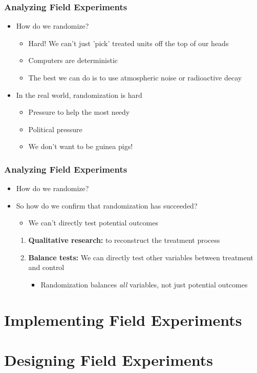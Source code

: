 \documentclass[xcolor=x11names,compress]{beamer}\usepackage[]{graphicx}\usepackage[]{color}
\renewcommand{\(}{\begin{columns}}
\renewcommand{\)}{\end{columns}}
\newcommand{\<}[1]{\begin{column}{#1}}
\renewcommand{\>}{\end{column}}
\begin{document}
\begin{frame}
\frametitle{Analyzing Field Experiments}
\begin{itemize}
\item How do we randomize?
\begin{itemize}
\item Hard! We can't just 'pick' treated units off the top of our heads
\pause
\item Computers are deterministic
\pause
\item The best we can do is to use atmospheric noise or radioactive decay
\pause
\end{itemize}
\item In the real world, randomization is hard
\begin{itemize}
\item Pressure to help the most needy
\pause
\item Political pressure
\pause
\item We don't want to be guinea pigs!
\end{itemize}
\end{itemize}
\end{frame}

\begin{frame}
\frametitle{Analyzing Field Experiments}
\begin{itemize}
\item How do we randomize?
\pause
\item So how do we confirm that randomization has succeeded?
\pause
\begin{itemize}
\item We can't directly test potential outcomes
\end{itemize}
\begin{enumerate}
\item \textbf{Qualitative research:} to reconstruct the treatment process
\pause
\item \textbf{Balance tests:} We can directly test other variables between treatment and control
\begin{itemize}
\item Randomization balances \textit{all} variables, not just potential outcomes
\end{itemize}
\end{enumerate}
\end{itemize}
\end{frame}


\section{Implementing Field Experiments}

\section{Designing Field Experiments}
\end{document}
